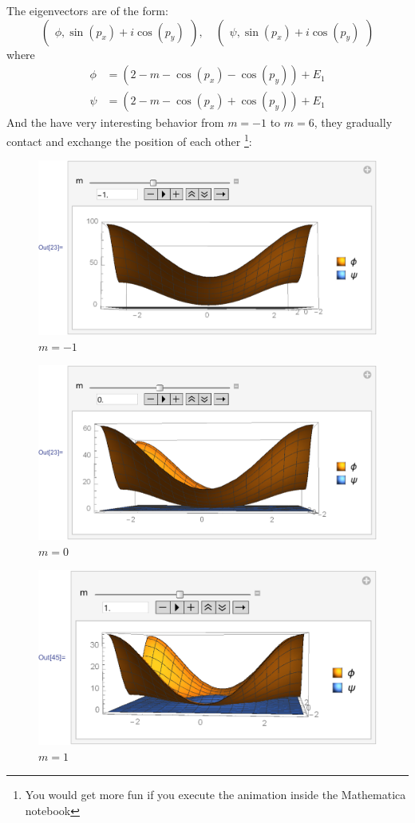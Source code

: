 \documentclass{article}
\begin{document}
The eigenvectors are of the form:
\begin{equation}
    \begin{pmatrix}
        \phi, \sin(p_x)+i\cos(p_y)
    \end{pmatrix},\quad \begin{pmatrix}
        \psi, \sin(p_x)+i\cos(p_y)
    \end{pmatrix}
\end{equation}
where
\begin{align}
    \phi &=  (2-m-\cos(p_x)-\cos(p_y))+E_1 \\
    \psi &=  (2-m-\cos(p_x)+\cos(p_y))+E_1
\end{align}
And the have very interesting behavior from $m=-1$ to $m=6$, they
gradually contact and exchange the position of each other
\footnote{You would get more fun if you execute the animation inside
the Mathematica notebook}:
\begin{figure}[H]
    \centering
    \includegraphics[width=0.6\linewidth]{pics/OpenBC-inXY/Eigen-mN1.pdf}
    \caption{$m=-1$}
\end{figure}
\begin{figure}[H]
    \centering
    \includegraphics[width=0.6\linewidth]{pics/OpenBC-inXY/Eigen-m0.pdf}
    \caption{$m=0$}
\end{figure}
\begin{figure}[H]
    \centering
    \includegraphics[width=0.6\linewidth]{pics/OpenBC-inXY/Eigen-m1.pdf}
    \caption{$m=1$}
\end{figure}
\end{document}
